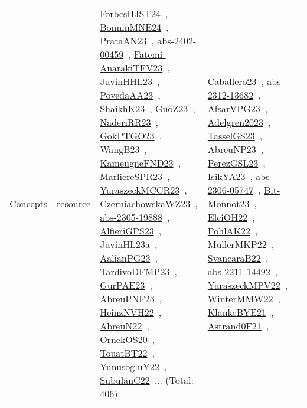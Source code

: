 {\begin{longtable}{lp{3cm}>{\raggedright\arraybackslash}p{6cm}>{\raggedright\arraybackslash}p{6cm}>{\raggedright\arraybackslash}p{8cm}}
Concepts & resource & \href{../works/ForbesHJST24.pdf}{ForbesHJST24}~\cite{ForbesHJST24}, \href{../works/BonninMNE24.pdf}{BonninMNE24}~\cite{BonninMNE24}, \href{../works/PrataAN23.pdf}{PrataAN23}~\cite{PrataAN23}, \href{../works/abs-2402-00459.pdf}{abs-2402-00459}~\cite{abs-2402-00459}, \href{../works/Fatemi-AnarakiTFV23.pdf}{Fatemi-AnarakiTFV23}~\cite{Fatemi-AnarakiTFV23}, \href{../works/JuvinHHL23.pdf}{JuvinHHL23}~\cite{JuvinHHL23}, \href{../works/PovedaAA23.pdf}{PovedaAA23}~\cite{PovedaAA23}, \href{../works/ShaikhK23.pdf}{ShaikhK23}~\cite{ShaikhK23}, \href{../works/GuoZ23.pdf}{GuoZ23}~\cite{GuoZ23}, \href{../works/NaderiRR23.pdf}{NaderiRR23}~\cite{NaderiRR23}, \href{../works/GokPTGO23.pdf}{GokPTGO23}~\cite{GokPTGO23}, \href{../works/WangB23.pdf}{WangB23}~\cite{WangB23}, \href{../works/KameugneFND23.pdf}{KameugneFND23}~\cite{KameugneFND23}, \href{../works/MarliereSPR23.pdf}{MarliereSPR23}~\cite{MarliereSPR23}, \href{../works/YuraszeckMCCR23.pdf}{YuraszeckMCCR23}~\cite{YuraszeckMCCR23}, \href{../works/CzerniachowskaWZ23.pdf}{CzerniachowskaWZ23}~\cite{CzerniachowskaWZ23}, \href{../works/abs-2305-19888.pdf}{abs-2305-19888}~\cite{abs-2305-19888}, \href{../works/AlfieriGPS23.pdf}{AlfieriGPS23}~\cite{AlfieriGPS23}, \href{../works/JuvinHL23a.pdf}{JuvinHL23a}~\cite{JuvinHL23a}, \href{../works/AalianPG23.pdf}{AalianPG23}~\cite{AalianPG23}, \href{../works/TardivoDFMP23.pdf}{TardivoDFMP23}~\cite{TardivoDFMP23}, \href{../works/GurPAE23.pdf}{GurPAE23}~\cite{GurPAE23}, \href{../works/AbreuPNF23.pdf}{AbreuPNF23}~\cite{AbreuPNF23}, \href{../works/HeinzNVH22.pdf}{HeinzNVH22}~\cite{HeinzNVH22}, \href{../works/AbreuN22.pdf}{AbreuN22}~\cite{AbreuN22}, \href{../works/OrnekOS20.pdf}{OrnekOS20}~\cite{OrnekOS20}, \href{../works/TouatBT22.pdf}{TouatBT22}~\cite{TouatBT22}, \href{../works/YunusogluY22.pdf}{YunusogluY22}~\cite{YunusogluY22}, \href{../works/SubulanC22.pdf}{SubulanC22}~\cite{SubulanC22}... (Total: 406) & \href{../works/Caballero23.pdf}{Caballero23}~\cite{Caballero23}, \href{../works/abs-2312-13682.pdf}{abs-2312-13682}~\cite{abs-2312-13682}, \href{../works/AfsarVPG23.pdf}{AfsarVPG23}~\cite{AfsarVPG23}, \href{../works/Adelgren2023.pdf}{Adelgren2023}~\cite{Adelgren2023}, \href{../works/TasselGS23.pdf}{TasselGS23}~\cite{TasselGS23}, \href{../works/AbreuNP23.pdf}{AbreuNP23}~\cite{AbreuNP23}, \href{../works/PerezGSL23.pdf}{PerezGSL23}~\cite{PerezGSL23}, \href{../works/IsikYA23.pdf}{IsikYA23}~\cite{IsikYA23}, \href{../works/abs-2306-05747.pdf}{abs-2306-05747}~\cite{abs-2306-05747}, \href{../works/Bit-Monnot23.pdf}{Bit-Monnot23}~\cite{Bit-Monnot23}, \href{../works/ElciOH22.pdf}{ElciOH22}~\cite{ElciOH22}, \href{../works/PohlAK22.pdf}{PohlAK22}~\cite{PohlAK22}, \href{../works/MullerMKP22.pdf}{MullerMKP22}~\cite{MullerMKP22}, \href{../works/SvancaraB22.pdf}{SvancaraB22}~\cite{SvancaraB22}, \href{../works/abs-2211-14492.pdf}{abs-2211-14492}~\cite{abs-2211-14492}, \href{../works/YuraszeckMPV22.pdf}{YuraszeckMPV22}~\cite{YuraszeckMPV22}, \href{../works/WinterMMW22.pdf}{WinterMMW22}~\cite{WinterMMW22}, \href{../works/KlankeBYE21.pdf}{KlankeBYE21}~\cite{KlankeBYE21}, \href{../works/Astrand0F21.pdf}{Astrand0F21}~\cite{Astrand0F21}, 
\end{longtable}}
